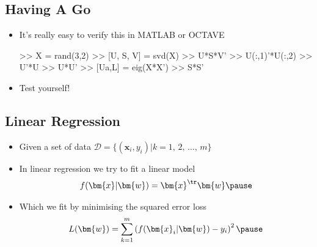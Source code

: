 \begin{slide}
\section{Having A Go}

\begin{PauseHighLight}
  \begin{itemize}
  \item It's really easy to verify this in MATLAB or OCTAVE\pause
\begin{matlab}
>> X = rand(3,2)
>> [U, S, V] = svd(X)
>> U*S*V'
>> U(:,1)'*U(:,2)
>> U'*U
>> U*U'
>> [Ua,L] = eig(X*X')
>> S*S'
\end{matlab}\pause
  \item Test yourself!\pause
  \end{itemize}
\end{PauseHighLight}

\end{slide}


\Outline %

\begin{slide}
\section{Linear Regression}

\begin{PauseHighLight}
  \begin{itemize}
  \item Given a set of data $\mathcal{D}= \{(\bm{x}_i, y_i)|k=1,\,2,\,\ldots,\, m\}$\pause
  \item In linear regression we try to fit a linear model
    \begin{align*}
      f(\bm{x}| \bm{w}) = \bm{x}^\tr \bm{w}\pause
    \end{align*}
  \item Which we fit by minimising the squared error loss
    \begin{align*}
      L(\bm{w}) = \sum_{k=1}^m \left(f(\bm{x}_i| \bm{w}) - y_i\right)^2\pause
    \end{align*}
  \end{itemize}
\end{PauseHighLight}

\end{slide}



